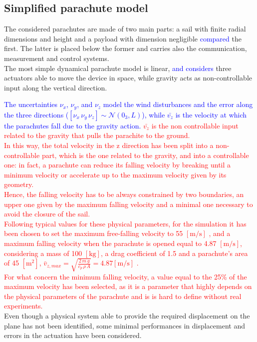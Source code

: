 \subsection{Simplified parachute model}
The considered parachutes are made of two main parts: a sail with finite radial dimensions and height and a payload with dimension negligible \textcolor{blue}{compared} the first. The latter is placed below the former and carries also the communication, measurement and control systems.\\
The most simple dynamical parachute model is linear, \textcolor{blue}{and considers} three actuators able to move the device in space, while gravity acts as non-controllable input along the vertical direction.

\textcolor{blue}{The uncertainties $\nu_x$, $\nu_y$, and $\nu_z$ model the wind disturbances and the error along the three directions ($\left[\nu_x \, \nu_y \,\nu_z \right]\sim\mathcal{N}\left(0_3, L\right)$), while $\bar{v_z}$ is the velocity at which the parachutes fall due to the gravity action. }
\textcolor{red}{
$\bar{v_z}$  is the non controllable input related to the gravity that pulls the parachite to the ground.\\
In this way, the total velocity in the z direction has been split into a non-controllable part, which is the one related to the gravity, and into a controllable one: in fact, a parachute can reduce its falling velocity by breaking until a minimum velocity or accelerate up to the maximum velocity given by its geometry.\\
Hence, the falling velocity has to be always constrained by two boundaries, an upper one given by the maximum falling velocity and a minimal one necessary to avoid the closure of the sail.\\
Following typical values for these physical parameters, for the simulation it has been chosen to set the maximum free-falling velocity to 55 $\left[\si{\meter\per\second}\right]$ \cite{b8}, and a maximum falling velocity when the parachute is opened equal to 4.87 $\left[\si{\meter\per\second}\right]$, considering a mass of 100 $\left[\si{\kilogram}\right]$, a drag coefficient of 1.5 and a parachute's area of 45 $\left[\si{\meter^2}\right]$,  $\bar{v}_{z,max} = \sqrt{\frac{2 \, m \, g}{c_p \, \rho \, A}} = 4.87 \left[\si{\meter\per\second}\right]$ \cite{b9}. \\
For what concern the minimum falling velocity, a value equal to the 25\% of the maximum velocity has been selected, as it is a parameter that highly depends on the physical parameters of the parachute and is is hard to define without real experiments.}\\
Even though a physical system able to provide the required displacement on the plane has not been identified, some minimal performances in displacement and errors in the actuation have been considered.
